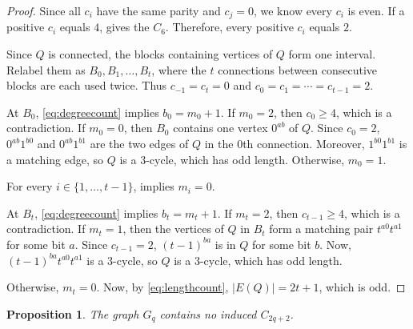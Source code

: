 \documentclass[11pt]{article}
\newtheorem{proposition}[theorem]{Proposition}
\theoremstyle{definition}
\theoremstyle{remark}
\begin{document}
\begin{proof}
Since all $c_i$ have the same parity and $c_j=0$, we know  every $c_i$ is even.  
If a positive $c_i$ equals $4$,  gives the $C_6$.  
Therefore, every positive $c_i$ equals $2$.

Since $Q$ is connected, the blocks containing vertices of  $Q$ form one interval.  
Relabel them as $B_0,B_1,\ldots,B_t$, where the $t$ connections between consecutive blocks are each used twice.  
Thus $c_{-1}=c_t=0$ and $c_0=c_1=\cdots=c_{t-1}=2$.

At $B_0$, \eqref{eq:degreecount} implies $b_0=m_0+1$.
If $m_0=2$, then $c_0\geq 4$, which is a contradiction. 
If $m_0=0$, then $B_0$ contains one vertex $0^{ab}$ of $Q$. 
Since $c_0=2$, $0^{ab}1^{b0}$ and $0^{ab}1^{b1}$ are the two edges of $Q$ in the $0$th connection. 
Moreover, $1^{b0}1^{b1}$ is a matching edge, so $Q$ is a $3$-cycle, which has odd length. 
Otherwise, $m_0=1$.

For every $i\in\{1, \ldots, t-1\}$,  implies $m_i=0$.

At $B_t$, \eqref{eq:degreecount} implies $b_t=m_t+1$.
If $m_t=2$, then $c_{t-1}\geq 4$, which is a contradiction. 
If $m_t=1$, then the vertices of $Q$ in $B_t$ form a matching pair $t^{a0}t^{a1}$ for some bit $a$.  
Since $c_{t-1}=2$, $(t-1)^{ba}$ is in $Q$ for some bit $b$. 
Now, $(t-1)^{ba}t^{a0}t^{a1}$ is a $3$-cycle, so $Q$ is a $3$-cycle, which has odd length. 

Otherwise, $m_t=0$. 
Now, by \eqref{eq:lengthcount}, $|E(Q)|=2t+1$, which is odd.
\end{proof}

\begin{proposition}\label{prop:free}
The graph $G_q$ contains no induced $C_{2q+2}$.
\end{proposition}
\end{document}
